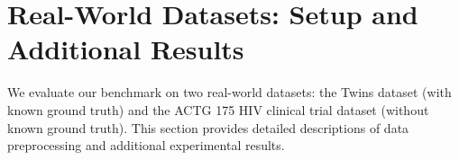 \documentclass{article} %
\newcommand{\rebuttal}[1]{\textcolor{black}{#1}}
\begin{document}




\clearpage

\section{Real-World Datasets: Setup and Additional Results} \label{app:more-real-data-setup-result}
We evaluate our benchmark on two real-world datasets: the Twins dataset (with known ground truth) and the ACTG 175 HIV clinical trial dataset (without known ground truth). This section provides detailed descriptions of data preprocessing and additional experimental results.
\end{document}
